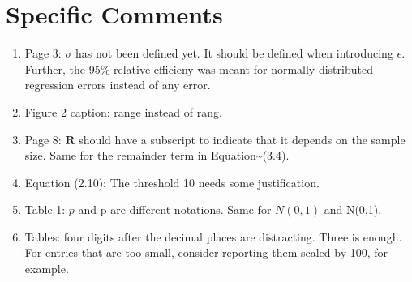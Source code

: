 \documentclass[12pt]{article}
\begin{document}
\section*{Specific Comments}

\begin{enumerate}
\item
  Page 3: \(\sigma\) has not been defined yet. It should be defined when
  introducing \(\epsilon\). Further, the 95\% relative efficieny was
  meant for normally distributed regression errors instead of any error.
\item
  Figure 2 caption: range instead of rang.
\item
  Page 8: \(\mathbf{R}\) should have a subscript to indicate that it
  depends on the sample size. Same for the remainder term in
  Equation\textasciitilde(3.4).
\item
  Equation (2.10): The threshold 10 needs some justification.
\item
  Table 1: \(p\) and p are different notations. Same for \(N(0,1)\) and
  N(0,1).
\item
  Tables: four digits after the decimal places are distracting. Three is
  enough. For entries that are too small, consider reporting them scaled
  by 100, for example.
\end{enumerate}
\end{document}
